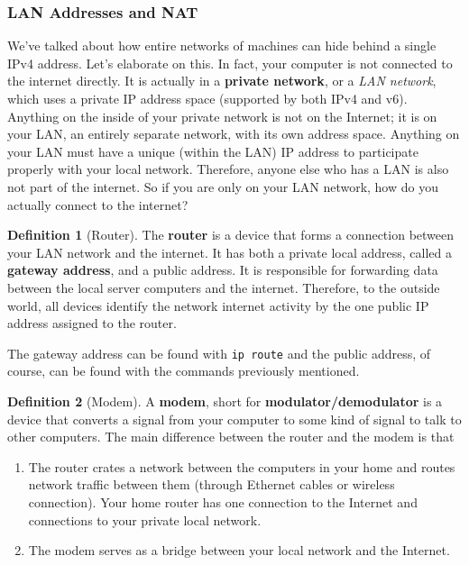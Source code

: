 \documentclass{article}
\theoremstyle{definition}
\newtheorem{definition}{Definition}[section]
\begin{document}
    \subsubsection{LAN Addresses and NAT} 

      We've talked about how entire networks of machines can hide behind a single IPv4 address. Let's elaborate on this. In fact, your computer is not connected to the internet directly. It is actually in a \textbf{private network}, or a \textit{LAN network}, which uses a private IP address space (supported by both IPv4 and v6). Anything on the inside of your private network is not on the Internet; it is on your LAN, an entirely separate network, with its own address space. Anything on your LAN must have a unique (within the LAN) IP address to participate properly with your local network. Therefore, anyone else who has a LAN is also not part of the internet. So if you are only on your LAN network, how do you actually connect to the internet? 

      \begin{definition}[Router] 
        The \textbf{router} is a device that forms a connection between your LAN network and the internet. It has both a private local address, called a \textbf{gateway address}, and a public address. It is responsible for forwarding data between the local server computers and the internet. Therefore, to the outside world, all devices identify the network internet activity by the one public IP address assigned to the router. 

        The gateway address can be found with \texttt{ip route} and the public address, of course, can be found with the commands previously mentioned. 
      \end{definition}

      \begin{definition}[Modem]
        A \textbf{modem}, short for \textbf{modulator/demodulator} is a device that converts a signal from your computer to some kind of signal to talk to other computers. The main difference between the router and the modem is that 
        \begin{enumerate} 
           \item The router crates a network between the computers in your home and routes network traffic between them (through Ethernet cables or wireless connection). Your home router has one connection to the Internet and connections to your private local network. 

          \item The modem serves as a bridge between your local network and the Internet.  
        \end{enumerate}
      \end{definition}
\end{document}
